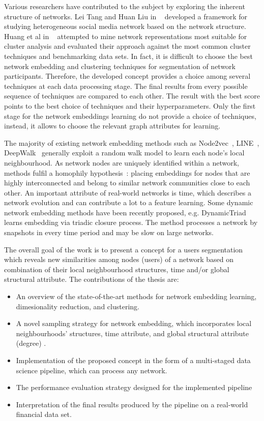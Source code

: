 Various researchers have contributed to the subject by exploring the inherent structure of networks. Lei Tang and Huan Liu in ~\cite{tang2011leveraging} developed a framework for studying heterogeneous social media network based on the network structure. Huang et al in ~\cite{DeepEmbeddingNetworkforClustering} attempted to mine network representations most suitable for cluster analysis and evaluated their approach against the most common cluster techniques and benchmarking data sets. In fact, it is difficult to choose the best network embedding and clustering techniques for segmentation of network participants. Therefore, the developed concept provides a choice among several techniques at each data processing stage. The final results from every possible sequence of techniques are compared to each other. The result with the best score points to the best choice of techniques and their hyperparameters. Only the first stage for the network embeddings learning do not provide a choice of techniques, instead, it allows to choose the relevant graph attributes for learning. 

The majority of existing network embedding methods such as Node2vec~\cite{node2vec}, LINE~\cite{tang2015line}, DeepWalk~\cite{perozzi2014deepwalk} generally exploit a random walk model to learn each node's local neighbourhood. As network nodes are uniquely identified within a network, methods fulfil a homophily hypothesis~\cite{fortunato2010community}: placing embeddings for nodes that are highly interconnected and belong to similar network communities close to each other. An important attribute of real-world networks is time, which describes a network evolution and can contribute a lot to a feature learning. Some dynamic network embedding methods have been recently proposed, e.g. DynamicTriad~\cite{zhou2018dynamic} learns embedding via triadic closure process. The method processes a network by snapshots in every time period and may be slow on large networks.

The overall goal of the work is to present a concept for a users segmentation which reveals new similarities among nodes (users) of a network based on combination of their local neighbourhood structures, time and/or global structural attribute. The contributions of the thesis are:
\begin{itemize}
\item An overview of the state-of-the-art methods for network embedding learning, dimesionality reduction, and clustering.
\item A novel sampling strategy for network embedding, which incorporates local neighbourhoods' structures, time attribute, and global structural attribute (degree) .
\item Implementation of the proposed concept in the form of a multi-staged data science pipeline, which can process any network.
\item The performance evaluation strategy designed for the implemented pipeline
\item Interpretation of the final results produced by the pipeline on a real-world financial data set.
 \end{itemize}
 
